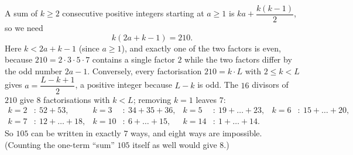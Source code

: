 A sum of $k\ge2$ consecutive positive integers starting at $a\ge1$ is $ka+\dfrac{k(k-1)}{2}$, so we need
\[
k(2a+k-1)=210 .
\]
Here $k<2a+k-1$ (since $a\ge1$), and exactly one of the two factors is even, because $210=2\cdot3\cdot5\cdot7$ contains a single factor $2$ while the two factors differ by the odd number $2a-1$. Conversely, every factorisation $210=k\cdot L$ with $2\le k<L$ gives $a=\dfrac{L-k+1}{2}$, a positive integer because $L-k$ is odd. The $16$ divisors of $210$ give $8$ factorisations with $k<L$; removing $k=1$ leaves $7$:
\[
\begin{aligned}
k=2&:\ 52+53, & k=3&:\ 34+35+36, & k=5&:\ 19+\dots+23, & k=6&:\ 15+\dots+20,\\
k=7&:\ 12+\dots+18, & k=10&:\ 6+\dots+15, & k=14&:\ 1+\dots+14 .
\end{aligned}
\]
So $105$ can be written in exactly $\boxed{7}$ ways, and eight ways are impossible. (Counting the one-term ``sum'' $105$ itself as well would give $8$.)
